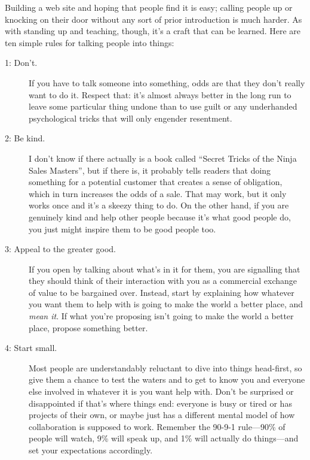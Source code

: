 
Building a web site and hoping that people find it is easy;
calling people up or knocking on their door without any sort of prior introduction
is much harder.
As with standing up and teaching,
though,
it's a craft that can be learned.
Here are ten simple rules for talking people into things:

\begin{description}

  \item[1: Don't.]
    If you have to talk someone into something,
    odds are that they don't really want to do it.
    Respect that:
    it's almost always better in the long run to leave some particular thing undone
    than to use guilt or any underhanded psychological tricks that will only engender resentment.

  \item[2: Be kind.]
    I don't know if there actually is a book called
    ``Secret Tricks of the Ninja Sales Masters'',
    but if there is,
    it probably tells readers that doing something for a potential customer
    that creates a sense of obligation,
    which in turn increases the odds of a sale.
    That may work, but it only works once and it's a skeezy thing to do.
    On the other hand,
    if you are genuinely kind
    and help other people because it's what good people do,
    you just might inspire them to be good people too.

  \item[3: Appeal to the greater good.]
    If you open by talking about what's in it for them,
    you are signalling that they should think of their interaction with you
    as a commercial exchange of value to be bargained over.
    Instead,
    start by explaining how whatever you want them to help with is going to make the world a better place,
    and \emph{mean it}.
    If what you're proposing isn't going to make the world a better place,
    propose something better.

  \item[4: Start small.]
    Most people are understandably reluctant to dive into things head-first,
    so give them a chance to test the waters
    and to get to know you and everyone else involved in
    whatever it is you want help with.
    Don't be surprised or disappointed if that's where things end:
    everyone is busy or tired or has projects of their own,
    or maybe just has a different mental model of how collaboration is supposed to work.
    Remember the 90-9-1 rule---90\% of people will watch,
    9\% will speak up,
    and 1\% will actually do things---and set your expectations accordingly.


\end{description}
